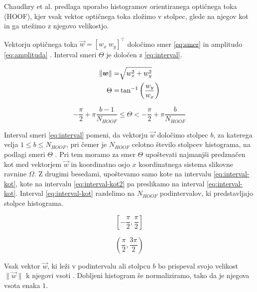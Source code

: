 Chaudhry et al. \cite{chaudhry2009histograms} predlaga uporabo histogramov orientiranega optičnega toka (HOOF), kjer vsak vektor optičnega toka zložimo v stolpec, glede na njegov kot in ga utežimo z njegovo velikostjo.

Vektorju optičnega toka $\vec{w} = [w_x~w_y]^\top$ določimo smer \eqref{eq:smer} in amplitudo \eqref{eq:amplituda} \cite{chaudhry2009histograms}. Interval smeri $\Theta$ je določen z \eqref{eq:interval}. 

\begin{align}
    \left\lVert {\boldsymbol{w}} \right\rVert = & \sqrt{w_x^2 + w_y^2} \label{eq:amplituda} \\
    \Theta = & \tan^{-1}\left( \frac{w_y}{w_x} \right) \label{eq:smer}
\end{align}


\begin{equation}\label{eq:interval}
	-\frac{\pi}{2} + \pi \frac{b - 1}{N_{HOOF}} \leq \Theta < - \frac{\pi}{2} + \pi \frac{b}{N_{HOOF}}
\end{equation}


Interval smeri \eqref{eq:interval} pomeni, da vektorju $\vec{w}$ določimo stolpec $b$, za katerega velja $1 \leq b \leq N_{HOOF}$, pri čemer je $N_{HOOF}$ celotno število stolpcev histograma, na podlagi smeri $\Theta$ \cite{chaudhry2009histograms}. Pri tem moramo za smer $\Theta$ upoštevati najmanjši predznačen kot med vektorjem $\vec{w}$ in koordinatno osjo $x$ koordinatnega sistema slikovne ravnine $\mathit{\Omega}$. Z drugimi besedami, upoštevamo samo kote na intervalu \eqref{eq:interval-kot}, kote na intervalu \eqref{eq:interval-kot2} pa preslikamo na interval \eqref{eq:interval-kot}. Interval \eqref{eq:interval-kot} razdelimo na $N_{HOOF}$ podintervalov, ki predstavljajo stolpce histograma. 

\begin{equation}\label{eq:interval-kot}
	\left[-\frac{\pi}{2}, \frac{\pi}{2}\right]
\end{equation}

\begin{equation}\label{eq:interval-kot2}
	\left(\frac{\pi}{2},\frac{3\pi}{2}\right)
\end{equation}

Vsak vektor $\vec{w}$, ki leži v podintervalu ali stolpcu $b$ bo prispeval svojo velikost $\|\vec{w} \|$ k njegovi vsoti \cite{chaudhry2009histograms}. Dobljeni histogram še normaliziramo, tako da je njegova vsota enaka $1$.






